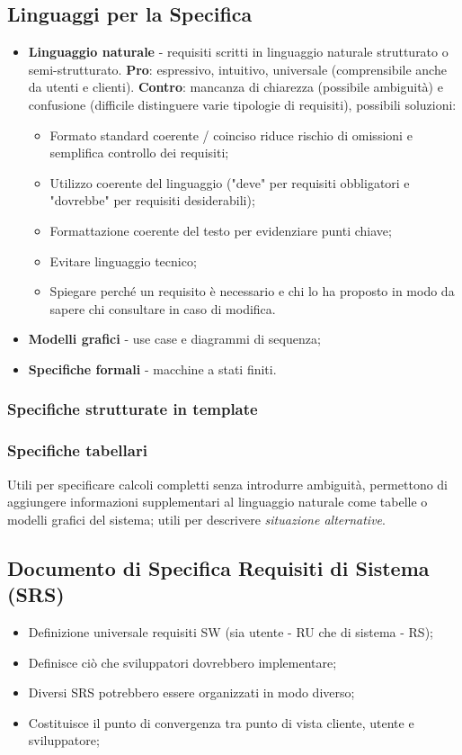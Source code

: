 \documentclass{article}
\begin{document}
    \subsection{Linguaggi per la Specifica}
      \begin{itemize}
        \item \textbf{Linguaggio naturale} - requisiti scritti in linguaggio naturale strutturato o semi-strutturato. \textbf{Pro}: espressivo, intuitivo, universale (comprensibile anche da utenti e clienti). \textbf{Contro}: mancanza di chiarezza (possibile ambiguità) e confusione (difficile distinguere varie tipologie di requisiti), possibili soluzioni:
          \begin{itemize}
            \item Formato standard coerente / coinciso riduce rischio di omissioni e semplifica controllo dei requisiti;
            \item Utilizzo coerente del linguaggio ("deve" per requisiti obbligatori e "dovrebbe" per requisiti desiderabili);
            \item Formattazione coerente del testo per evidenziare punti chiave;
            \item Evitare linguaggio tecnico;
            \item Spiegare perché un requisito è necessario e chi lo ha proposto in modo da sapere chi consultare in caso di modifica.
          \end{itemize}
        \item \textbf{Modelli grafici} - use case e diagrammi di sequenza;
        \item \textbf{Specifiche formali} - macchine a stati finiti.
      \end{itemize}
      \subsubsection{Specifiche strutturate in template}
      \subsubsection{Specifiche tabellari}
        Utili per specificare calcoli completti senza introdurre ambiguità, permettono di aggiungere informazioni supplementari al linguaggio naturale come tabelle o modelli grafici del sistema; utili per descrivere \textit{situazione alternative}. 
    \subsection{Documento di Specifica Requisiti di Sistema (SRS)}
      \begin{itemize}
        \item Definizione universale requisiti SW (sia utente - RU che di sistema - RS);
        \item Definisce ciò che sviluppatori dovrebbero implementare;
        \item Diversi SRS potrebbero essere organizzati in modo diverso;
        \item Costituisce il punto di convergenza tra punto di vista cliente, utente e sviluppatore;
      \end{itemize}
\end{document}
